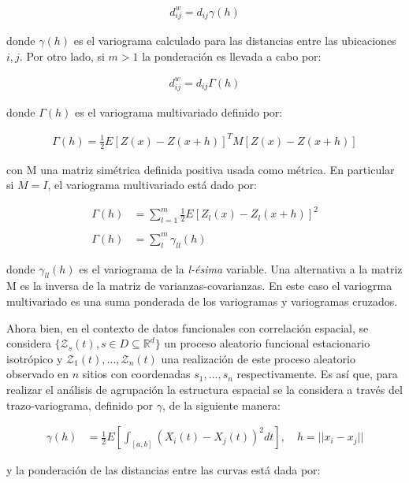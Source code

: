 \documentclass[
]{book}
\begin{document}
\begin{align*}
    d_{ij}^w=d_{ij}\gamma(h)
\end{align*}

donde \(\gamma(h)\) es el variograma calculado para las distancias entre las ubicaciones \(i,j\). Por otro lado, si \(m>1\) la ponderación es llevada a cabo por:

\begin{align*}
    d_{ij}^w=d_{ij}\Gamma(h)
\end{align*}

donde \(\Gamma(h)\) es el variograma multivariado definido por:

\begin{align*}
    \Gamma(h)=\frac{1}{2}E[Z(x)-Z(x+h)]^T M[Z(x)-Z(x+h)]
\end{align*}

con M una matriz simétrica definida positiva usada como métrica. En particular si \(M=I\), el variograma multivariado está dado por:

\begin{align*}
    \Gamma(h)&=\sum_{l=1}^m \frac{1}{2} E[Z_l (x) - Z_l (x+h)]^2\\\\
    \Gamma(h)&=\sum_{l}^m \gamma_{ll}(h)
\end{align*}

donde \(\gamma_{ll}(h)\) es el variograma de la \emph{l-ésima} variable. Una alternativa a la matriz M es la inversa de la matriz de varianzas-covarianzas. En este caso el variogrma multivariado es una suma ponderada de los variogramas y variogramas cruzados.

Ahora bien, en el contexto de datos funcionales con correlación espacial, se considera \(\{\mathcal{Z}_s(t), s\in D\subseteq \mathbb{R}^d\}\) un proceso aleatorio funcional estacionario isotrópico y \(\mathcal{Z}_1(t),...,\mathcal{Z}_n(t)\) una realización de este proceso aleatorio observado en \(n\) sitios con coordenadas \(s_1,...,s_n\) respectivamente. Es así que, para realizar el análisis de agrupación la estructura espacial se la considera a través del trazo-variograma, definido por \(\gamma\), de la siguiente manera:

\begin{align*}
    \gamma(h)&=\frac{1}{2}E\left[\int_{[a,b]}(X_i(t)-X_j(t))^2dt \right],\quad h=||x_i-x_j||
\end{align*}

y la ponderación de las distancias entre las curvas está dada por:
\end{document}

